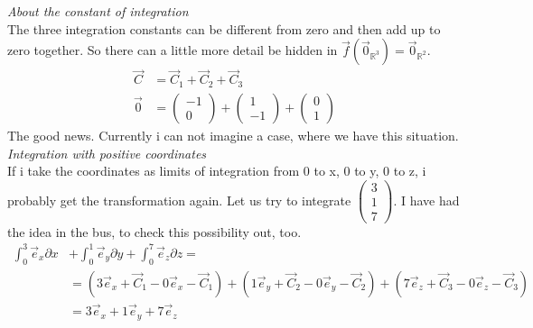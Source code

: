 \documentclass[a4paper]{article}
\begin{document}
\begin{Example}
\emph{About the constant of integration}\\

The three integration constants can be different from zero and then add up to zero together. So there can a little more detail be hidden in $\vec{f}(\vec{0}_{\mathbb{R}^{3}}) = \vec{0}_{\mathbb{R}^{2}}$.\\
\begin{displaymath}
\begin{align}
\vec{C} &= \vec{C}_{1} + \vec{C}_{2} + \vec{C}_{3} \\
\vec{0} &= \begin{pmatrix}-1\\0\end{pmatrix}+\begin{pmatrix}1\\-1\end{pmatrix}+\begin{pmatrix}0\\1\end{pmatrix}
\end{align}
\end{displaymath}
The good news. Currently i can not imagine a case, where we have this situation.\\

\emph{Integration with positive coordinates}\\

If i take the coordinates as limits of integration from 0 to x, 0 to y, 0 to z, i probably get the transformation again.
Let us try to integrate $\begin{pmatrix}3\\1\\7\end{pmatrix}$. I have had the idea in the bus, to check this possibility out, too.\\

\begin{displaymath}
\begin{align}
\int_{0}^{3}\vec{e}_{x}\partial{x} &+
\int_{0}^{1}\vec{e}_{y}\partial{y} +
\int_{0}^{7}\vec{e}_{z}\partial{z} =\\
&= (3\vec{e}_{x}+\vec{C}_{1}-0\vec{e}_{x}-\vec{C}_{1}) + (1\vec{e}_{y}+\vec{C}_{2}-0\vec{e}_{y}-\vec{C}_{2}) + (7\vec{e}_{z}+\vec{C}_{3}-0\vec{e}_{z}-\vec{C}_{3})\\
&= 3\vec{e}_{x} + 1\vec{e}_{y} + 7\vec{e}_{z}\\
\end{align}
\end{displaymath}


\end{Example}
\end{document}
